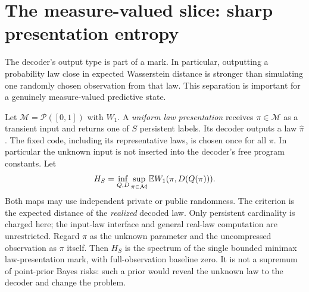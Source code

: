 \section{The measure-valued slice: sharp presentation entropy}
\label{sec:v8-measures}
The decoder's output type is part of a mark. In particular, outputting a
probability law close in expected Wasserstein distance is stronger than
simulating one randomly chosen observation from that law. This
separation is important for a genuinely measure-valued predictive state.

Let $\mathcal M=\mathcal P([0,1])$ with $W_1$. A \emph{uniform law
presentation} receives $\pi\in\mathcal M$ as a transient input and
returns one of $S$ persistent labels. Its decoder outputs a law
$\widehat\pi$. The fixed code, including its representative laws, is
chosen once for all $\pi$. In particular the unknown input is not
inserted into the decoder's free program constants. Let
\begin{equation}
 H_S=\inf_{Q,D}\sup_{\pi\in\mathcal M}
                           \mathbb E W_1(\pi,D(Q(\pi))).     \label{eq:v8-lawprofile}
\end{equation}
Both maps may use independent private or public randomness. The
criterion is the expected distance of the \emph{realized} decoded law.
Only persistent cardinality is charged here; the input-law interface
and general real-law computation are unrestricted. Regard $\pi$ as the
unknown parameter and the uncompressed observation as $\pi$ itself.
Then $H_S$ is the spectrum of the single bounded minimax law-presentation
mark, with full-observation baseline zero. It is not a supremum of
point-prior Bayes risks: such a prior would reveal the unknown law to
the decoder and change the problem.

